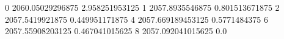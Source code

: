 0 2060.05029296875 2.958251953125
1 2057.8935546875 0.801513671875
2 2057.5419921875 0.449951171875
4 2057.669189453125 0.5771484375
6 2057.55908203125 0.467041015625
8 2057.092041015625 0.0
